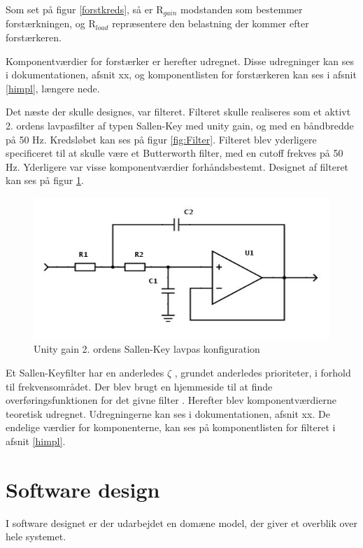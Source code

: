 Som set på figur \ref{forstkreds}, så er R$_{gain}$ modstanden som bestemmer forstærkningen, og R$_{load}$ repræsentere den belastning der kommer efter forstærkeren. 

Komponentværdier for forstærker er herefter udregnet. Disse udregninger kan ses i dokumentationen, afsnit xx, og komponentlisten for forstærkeren kan ses i afsnit \ref{himpl}, længere nede. 

Det næste der skulle designes, var filteret. Filteret skulle realiseres som et aktivt 2. ordens lavpasfilter af typen Sallen-Key med unity gain, og med en båndbredde på 50 Hz. Kredsløbet kan ses på figur \ref{fig:Filter}. Filteret blev yderligere specificeret til at skulle være et Butterworth filter, med en cutoff frekves på 50 Hz. Yderligere var visse komponentværdier forhåndsbestemt. Designet af filteret kan ses på figur \ref{fig:rFilter}.

\begin{figure}[H]
	\centering
	\includegraphics[width=1\textwidth]{Figurer/Hardware/FilterDesign}
	\caption{Unity gain 2. ordens Sallen-Key lavpas konfiguration}
	\label{fig:rFilter}
\end{figure}

Et Sallen-Keyfilter har en anderledes $\zeta$ , grundet anderledes prioriteter, i forhold til frekvensområdet. Der blev brugt en hjemmeside til at finde overføringsfunktionen for det givne filter \cite{overforing}. Herefter blev komponentværdierne teoretisk udregnet. Udregningerne kan ses i dokumentationen, afsnit xx. De endelige værdier for komponenterne, kan ses på komponentlisten for filteret i afsnit \ref{himpl}. 
   
   
\section{Software design}\label{Software arkitektur}
   I software designet er der udarbejdet en domæne model, der giver et overblik over hele systemet.
   
